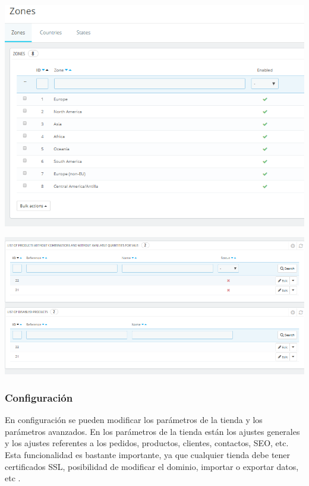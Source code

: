 \documentclass{article}
\begin{document}
\begin{center}
\includegraphics[scale=0.6]{images/zona.png}
\end{center}

\begin{center}
\includegraphics[scale=0.4]{images/lista.png}
\end{center}

\subsubsection{Configuración}

En configuración se pueden modificar los parámetros de la tienda y los parámetros avanzados. En los parámetros de la tienda están los ajustes generales y los ajustes referentes a los pedidos, productos, clientes, contactos, SEO, etc.
Esta funcionalidad es bastante importante, ya que cualquier tienda debe tener certificados SSL, posibilidad de modificar el dominio, importar o exportar datos, etc .
\end{document}
